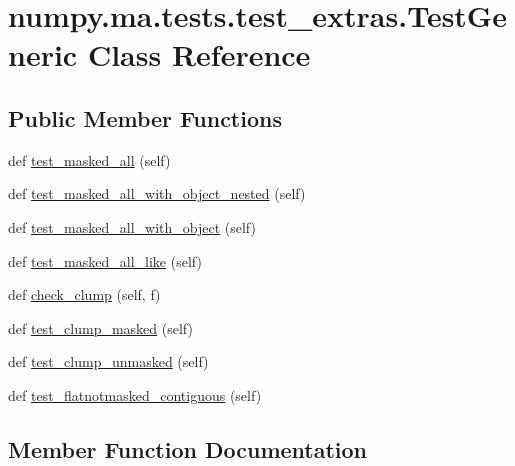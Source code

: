\hypertarget{classnumpy_1_1ma_1_1tests_1_1test__extras_1_1TestGeneric}{}\section{numpy.\+ma.\+tests.\+test\+\_\+extras.\+Test\+Generic Class Reference}
\label{classnumpy_1_1ma_1_1tests_1_1test__extras_1_1TestGeneric}
\subsection*{Public Member Functions}
\begin{DoxyCompactItemize}
\item 
def \hyperlink{classnumpy_1_1ma_1_1tests_1_1test__extras_1_1TestGeneric_aaaa118cece0d88df8354ea3843830923}{test\+\_\+masked\+\_\+all} (self)
\item 
def \hyperlink{classnumpy_1_1ma_1_1tests_1_1test__extras_1_1TestGeneric_a7245987b2d47c8d4c38d52d5c45b1f9a}{test\+\_\+masked\+\_\+all\+\_\+with\+\_\+object\+\_\+nested} (self)
\item 
def \hyperlink{classnumpy_1_1ma_1_1tests_1_1test__extras_1_1TestGeneric_a72f2772dd5a5162eb77f84a65137e56e}{test\+\_\+masked\+\_\+all\+\_\+with\+\_\+object} (self)
\item 
def \hyperlink{classnumpy_1_1ma_1_1tests_1_1test__extras_1_1TestGeneric_a0619cb840def59551302805e627aacba}{test\+\_\+masked\+\_\+all\+\_\+like} (self)
\item 
def \hyperlink{classnumpy_1_1ma_1_1tests_1_1test__extras_1_1TestGeneric_ae08df4de7517a7eb72a4a0a43edf0682}{check\+\_\+clump} (self, f)
\item 
def \hyperlink{classnumpy_1_1ma_1_1tests_1_1test__extras_1_1TestGeneric_a810c09bff14643ca33083e032323c443}{test\+\_\+clump\+\_\+masked} (self)
\item 
def \hyperlink{classnumpy_1_1ma_1_1tests_1_1test__extras_1_1TestGeneric_ae334d731312ff109a07e452aee03667a}{test\+\_\+clump\+\_\+unmasked} (self)
\item 
def \hyperlink{classnumpy_1_1ma_1_1tests_1_1test__extras_1_1TestGeneric_ad048cf28ede8b3f10491efe61462e85d}{test\+\_\+flatnotmasked\+\_\+contiguous} (self)
\end{DoxyCompactItemize}


\subsection{Member Function Documentation}
\mbox{\label{classnumpy_1_1ma_1_1tests_1_1test__extras_1_1TestGeneric_ae08df4de7517a7eb72a4a0a43edf0682}} 
